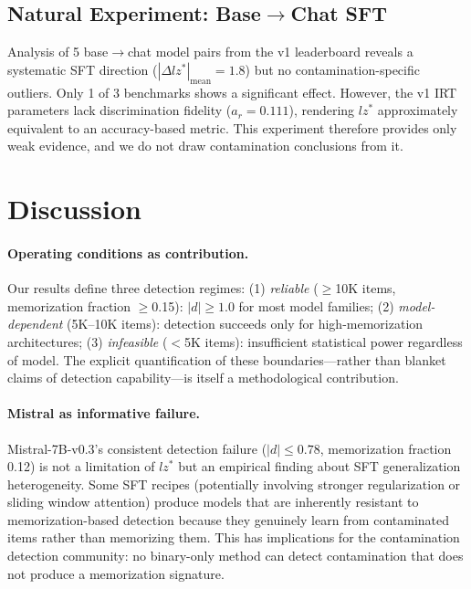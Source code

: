 \documentclass[11pt]{article}
\begin{document}
\subsection{Natural Experiment: Base$\rightarrow$Chat SFT}
\label{sec:natural}

Analysis of 5 base$\rightarrow$chat model pairs from the v1 leaderboard reveals a systematic SFT direction ($|\Delta lz^*|_{\text{mean}} = 1.8$) but no contamination-specific outliers.
Only 1 of 3 benchmarks shows a significant effect.
However, the v1 IRT parameters lack discrimination fidelity ($a_r = 0.111$), rendering $lz^*$ approximately equivalent to an accuracy-based metric.
This experiment therefore provides only weak evidence, and we do not draw contamination conclusions from it.

\section{Discussion}
\label{sec:discussion}

\paragraph{Operating conditions as contribution.}
Our results define three detection regimes: (1) \emph{reliable} ($\geq$10K items, memorization fraction $\geq$0.15): $|d| \geq 1.0$ for most model families; (2) \emph{model-dependent} (5K--10K items): detection succeeds only for high-memorization architectures; (3) \emph{infeasible} ($<$5K items): insufficient statistical power regardless of model.
The explicit quantification of these boundaries---rather than blanket claims of detection capability---is itself a methodological contribution.

\paragraph{Mistral as informative failure.}
Mistral-7B-v0.3's consistent detection failure ($|d| \leq 0.78$, memorization fraction 0.12) is not a limitation of $lz^*$ but an empirical finding about SFT generalization heterogeneity.
Some SFT recipes (potentially involving stronger regularization or sliding window attention) produce models that are inherently resistant to memorization-based detection because they genuinely learn from contaminated items rather than memorizing them.
This has implications for the contamination detection community: no binary-only method can detect contamination that does not produce a memorization signature.
\end{document}
